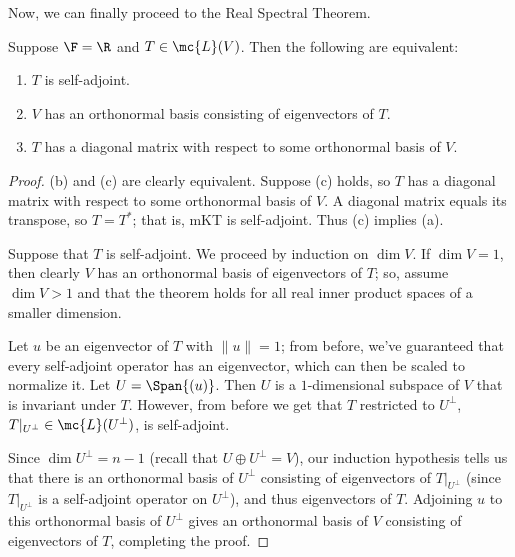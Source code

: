 \documentclass[math0540-lecture-notes.tex]{subfiles}
\begin{document}
Now, we can finally proceed to the Real Spectral Theorem.
\begin{theorem}{}
  Suppose $\F=\R$ and $T\in \mc{L}(V)$. Then the following are equivalent:
  \begin{enumerate}
    \item $T$ is self-adjoint.
    \item $V$ has an orthonormal basis consisting of eigenvectors of $T$.
    \item $T$ has a diagonal matrix with respect to some orthonormal basis of $V$.
  \end{enumerate}
\end{theorem}
\begin{proof}[Proof]
  (b) and (c) are clearly equivalent. Suppose (c) holds, so $T$ has a diagonal matrix with respect
  to some orthonormal basis of $V$. A diagonal matrix equals its transpose, so $T=T^*$; that is, mKT
  is self-adjoint. Thus (c) implies (a).

  Suppose that $T$ is self-adjoint. We proceed by induction on $\dim{V}$. If $\dim{V}=1$, then
  clearly $V$ has an orthonormal basis of eigenvectors of $T$; so, assume $\dim{V}>1$ and that the
  theorem holds for all real inner product spaces of a smaller dimension.

  Let $u$ be an eigenvector of $T$ with $\|u\|=1$; from before, we've guaranteed that every
  self-adjoint operator has an eigenvector, which can then be scaled to normalize it. Let
  $U=\Span{(u)}$. Then $U$ is a $1$-dimensional subspace of $V$ that is invariant under $T$.
  However, from before we get that $T$ restricted to $U^{\bot}$, $T|_{U^{\bot}}\in
  \mc{L}(U^{\bot})$, is self-adjoint.

  Since $\dim{U^{\bot}}=n-1$ (recall that $U\oplus U^{\bot}=V$), our induction hypothesis tells us
  that there is an orthonormal basis of $U^{\bot}$ consisting of eigenvectors of $T|_{U^{\bot}}$
  (since $T|_{U^{\bot}}$ is a self-adjoint operator on $U^{\bot}$), and thus eigenvectors of $T$.
  Adjoining $u$ to this orthonormal basis of $U^{\bot}$ gives an orthonormal basis of $V$ consisting
  of eigenvectors of $T$, completing the proof.
\end{proof}
\end{document}

